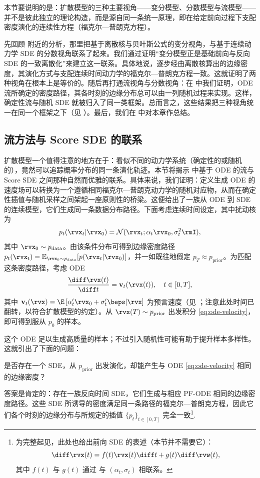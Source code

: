 本节要说明的是：扩散模型的三种主要视角——变分模型、分数模型与流模型——并不是彼此独立的理论构造，而是源自同一条统一原理，即在给定前向过程下支配密度演化的连续性方程（福克尔—普朗克方程）。

先回顾  附近的分析，那里把基于离散核与贝叶斯公式的变分视角，与基于连续动力学 SDE 的分数视角联系了起来。我们通过证明“变分模型正是基础前向与反向 SDE 的一致离散化”来建立这一联系。具体地说，逐步经由离散核算出的边缘密度，其演化方式与支配连续时间动力学的福克尔—普朗克方程一致。这就证明了两种视角在根本上是等价的。随后再打通流视角与分数视角：在  中我们证明，ODE 流所确定的密度路径，其各时刻的边缘分布总可以由一列随机过程来实现。这样，确定性流与随机 SDE 就被归入了同一类框架。总而言之，这些结果把三种视角统一在同一个框架之下（见 ）。最后，我们在  中对本章作总结。


\subsection{流方法与 Score SDE 的联系}\label{subsec:flow-score}

扩散模型一个值得注意的地方在于：看似不同的动力学系统（确定性的或随机的），竟然可以追踪概率分布的同一条演化轨迹。本节将揭示  中基于 ODE 的流与 Score SDE 之间那种自然而优雅的联系。具体来说，我们证明：定义生成 ODE 的速度场可以转换为一个遵循相同福克尔—普朗克动力学的随机对应物，从而在确定性插值与随机采样之间架起一座原则性的桥梁。这便给出了一族从 ODE 到 SDE 的连续模型，它们生成同一条数据分布路径。下面考虑连续时间设定，其中扰动核为
\[
p_t(\rvx_t|\rvx_0) = \mathcal{N}(\rvx_t; \alpha_t \rvx_0, \sigma_t^2 \rmI),
\]
其中 $\rvx_0 \sim p_{\mathrm{data}}$。由该条件分布可得到边缘密度路径 $p_t(\rvx_t) = \mathbb{E}_{\rvx_0 \sim p_{\mathrm{data}}}[p(\rvx_t|\rvx_0)]$，并一如既往地假定 $p_T\approx p_{\mathrm{prior}}$。为匹配这条密度路径，考虑 ODE
\begin{align}\label{eq:ode-velocity}
    \frac{\diff\rvx(t)}{\diff t} = \mathbf{v}_t(\rvx(t)), \quad t \in [0,T],
\end{align}
其中 $\mathbf{v}_t(\rvx) =\E\left[\alpha_t'\rvx_0+\sigma_t'\beps|\rvx\right]$ 为预言速度（见 ；注意此处时间已翻转，以符合扩散模型的约定）。从 $\rvx(T)\sim p_{\mathrm{prior}}$ 出发积分 \eqref{eq:ode-velocity}，即可得到服从 $p_0$ 的样本。

这个 ODE 足以生成高质量的样本；不过引入随机性可能有助于提升样本多样性。这就引出了下面的问题：
\begin{question}
是否存在一个 SDE，从 $p_{\mathrm{prior}}$ 出发演化，却能产生与 ODE \eqref{eq:ode-velocity} 相同的边缘密度？
\end{question}
答案是肯定的：存在一族反向时间 SDE，它们生成与相应 PF-ODE 相同的边缘密度路径。这些 SDE 所诱导的密度满足同一条路径的福克尔—普朗克方程，因此它们各个时刻的边缘分布与所规定的插值 $\{p_t\}_{t\in[0,T]}$ 完全一致\footnote{为完整起见，此处也给出前向 SDE 的表述（本节并不需要它）：
\[
\diff \rvx(t)=f(t) \rvx(t) \diff t+g(t) \diff \rvw(t),
\]
其中 $f(t)$ 与 $g(t)$ 通过  与 $(\alpha_t,\sigma_t)$ 相联系。}.


